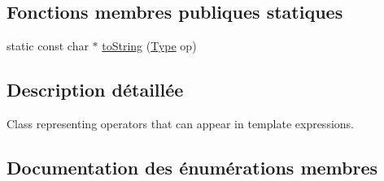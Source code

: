 \subsection*{Fonctions membres publiques statiques}
\begin{DoxyCompactItemize}
\item 
static const char $\ast$ \hyperlink{class_operator_a30a56db9e007e273b7ccc49913519366}{to\+String} (\hyperlink{class_operator_adf562143104191264da67b4e6e1a1644}{Type} op)
\end{DoxyCompactItemize}


\subsection{Description détaillée}
Class representing operators that can appear in template expressions. 

\subsection{Documentation des énumérations membres}
\hypertarget{class_operator_adf562143104191264da67b4e6e1a1644}{}
